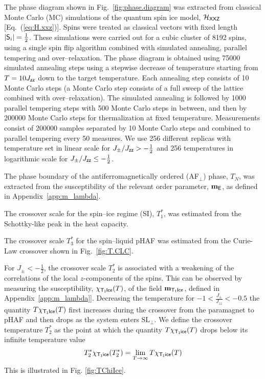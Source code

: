 \documentclass[apsrev4-1,prx,superscriptaddress,floatfix,twocolumn,longbibliography]{revtex4-1}
\begin{document}
\begin{appendix}
The phase diagram shown in Fig.~\ref{fig:phase.diagram} was extracted from 
classical Monte Carlo (MC) simulations of the quantum spin ice model, 
$\mathcal{H}_{\sf XXZ}$ [Eq.~(\ref{eq:H.xxz})].  
%
Spins were treated as classical vectors with fixed length $|{\sf S}_i|=\frac{1}{2}$.
%
These simulations were carried out for a cubic cluster of 8192 spins,
using a single spin flip algorithm combined with simulated annealing,
parallel tempering and over--relaxation. The phase diagram is obtained
using 75000 simulated annealing steps using a stepwise decrease of
temperature starting from $T=10 J_{\sf zz}$ down to the target
temperature. 
%
Each annealing step consists of 10 Monte Carlo
steps (a Monte Carlo step consists of a full sweep of the lattice
combined with over--relaxation). The simulated annealing is followed by
1000 parallel tempering steps with 500 Monte Carlo steps in between,
and then by 200000 Monte Carlo steps for thermalization at fixed
temperature. Measurements consist of 200000 samples separated by 10
Monte Carlo steps and combined to parallel tempering every 50
measures. We use 256 different replicas with temperature set in linear
scale for $J_{\pm}/J_{\sf zz}>-\frac12$ and 256 temperatures in
logarithmic scale for $J_{\pm}/J_{\sf zz}\le -\frac12$.


The phase boundary of the antiferromagnetically ordered (AF$_{\perp}$) phase,
$T_N$, was extracted from the susceptibility of the relevant order
parameter, ${\bf m}_{\sf E}$, as defined in Appendix~\ref{app:m_lambda}.


The crossover scale for the spin--ice regime (SI), $T_1^*$, was
estimated from the Schottky-like peak in the heat capacity.


The crossover scale $T_3^{\ast}$ for the spin--liquid pHAF was 
estimated from the Curie-Law crossover shown in Fig.~\ref{fig:T.CLC}.


For \mbox{$J_\pm < -\frac{1}{2}$}, the crossover scale $T_2^*$ is associated
with a weakening of the correlations of the local $z$-components of the spins. 
%
This can be observed by measuring the susceptibility, $\chi_{\sf T_1 Ice}(T)$, of the field
${\bf m}_{\sf T_1 Ice}$, defined in Appendix~\ref{app:m_lambda}].
%
Decreasing the temperature for $-1<\frac{J_{\pm}}{J_{zz}}<-0.5$
the quantity $T\chi_{\sf T_1 Ice}(T)$ first increases during the crossover
from the paramagnet to pHAF and then drops as the system 
enters $\text{SL}_\perp$.
%
We define the crossover temperature $T_2^{\ast}$ as the point
at which the quantity $T \chi_{\sf T_1 ice}(T)$ drops below its infinite 
temperature value
%
\begin{eqnarray}
T_2^{\ast}\chi_{\sf T_1 ice}(T_2^{\ast})=\lim_{T\to \infty}T \chi_{\sf T_1 ice}(T)
\label{eq:T2criterion}
\end{eqnarray}
%
This is illustrated in Fig.  \ref{fig:TChiIce}.





\end{appendix}
\end{document}
